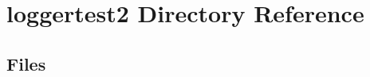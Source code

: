 \section{loggertest2 Directory Reference}
\label{dir_832aedc08bba8edab74f2245809a1f2f}
\subsection*{Files}
\begin{DoxyCompactItemize}
\end{DoxyCompactItemize}
